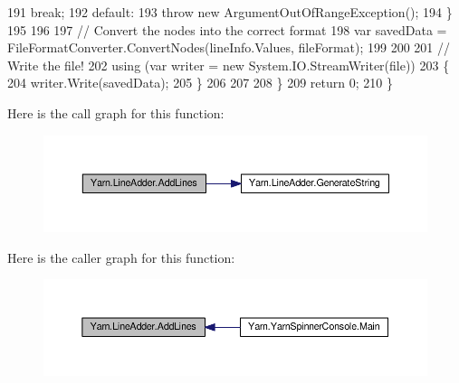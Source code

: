 \begin{DoxyCode}
191                         \textcolor{keywordflow}{break};
192                     \textcolor{keywordflow}{default}:
193                         \textcolor{keywordflow}{throw} \textcolor{keyword}{new} ArgumentOutOfRangeException();
194                 \}
195 
196 
197                 \textcolor{comment}{// Convert the nodes into the correct format}
198                 var savedData = FileFormatConverter.ConvertNodes(lineInfo.Values, fileFormat);
199 
200 
201                 \textcolor{comment}{// Write the file!}
202                 \textcolor{keyword}{using} (var writer = \textcolor{keyword}{new} System.IO.StreamWriter(file))
203                 \{
204                     writer.Write(savedData);
205                 \}
206 
207 
208             \}
209             \textcolor{keywordflow}{return} 0;
210         \}
\end{DoxyCode}


Here is the call graph for this function\-:
\nopagebreak
\begin{figure}[H]
\begin{center}
\leavevmode
\includegraphics[width=350pt]{a00132_aa2b8af349e709b8a45d42af5146ca848_cgraph}
\end{center}
\end{figure}




Here is the caller graph for this function\-:
\nopagebreak
\begin{figure}[H]
\begin{center}
\leavevmode
\includegraphics[width=350pt]{a00132_aa2b8af349e709b8a45d42af5146ca848_icgraph}
\end{center}
\end{figure}


